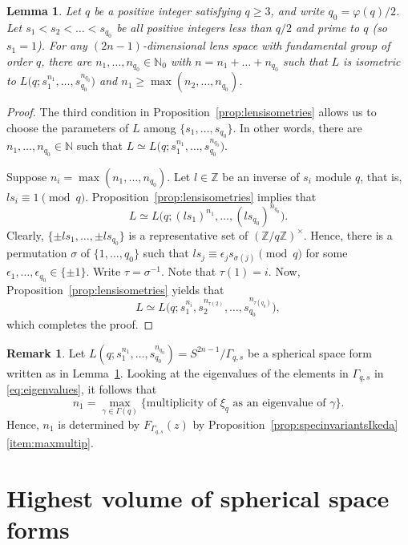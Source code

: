 \documentclass[12pt,a4paper,final]{amsart}
\theoremstyle{plain}
\newtheorem{lemma}[theorem]{Lemma}
\theoremstyle{definition}
\newtheorem{remark}[theorem]{Remark}
\theoremstyle{remark}
\numberwithin{equation}{section}
\newcommand{\N}{\mathbb N}
\newcommand{\Z}{\mathbb Z}
\begin{document}
\begin{lemma}\label{lem:exponentemaximo}
Let $q$ be a positive integer satisfying $q\geq3$, and write $q_0=\varphi(q)/2$.   
Let $s_1<s_2<\dots<s_{q_0}$ be all positive integers less than $q/2$ and prime to $q$ (so $s_1=1$). 
For any $(2n-1)$-dimensional lens space with fundamental group of order $q$, there are $n_1,\dots,n_{q_0}\in\N_0$  with $n=n_1+\dots+n_{q_0}$ such that 
$L$ is isometric to $L\big(q;s_1^{n_1},\dots,s_{q_0}^{n_{q_0}}\big)$
and $n_1\geq \max(n_2,\dots,n_{q_0})$. 
\end{lemma}

\begin{proof}
The third condition in Proposition~\ref{prop:lensisometries} allows us to choose the parameters of $L$ among $\{s_1,\dots,s_{q_0}\}$. 
In other words, there are $n_1,\dots,n_{q_0}\in\N$ such that $L\simeq L\big(q;s_1^{n_1},\dots,s_{q_0}^{n_{q_0}}\big)$. 

Suppose $n_i=\max(n_1,\dots,n_{q_0})$. 
Let $l\in\Z$ be an inverse of $s_i$ module $q$, that is, $ls_i\equiv 1\pmod q$. 
Proposition~\ref{prop:lensisometries} implies that
$$
L
\simeq L\big(q;(ls_1)^{n_1},\dots,(ls_{q_0})^{n_{q_0}}\big). 
$$
Clearly, $\{\pm ls_1,\dots,\pm ls_{q_0}\}$ is a representative set of $(\Z/q\Z)^\times$.
Hence, there is a permutation $\sigma$ of $\{1,\dots,q_0\}$ such that $ls_j\equiv \epsilon_j s_{\sigma(j)}\pmod q$ for some $\epsilon_1,\dots,\epsilon_{q_0} \in\{\pm1\}$. 
Write $\tau=\sigma^{-1}$.
Note that $\tau(1)=i$. 
Now, Proposition~\ref{prop:lensisometries} yields that
$$
L
\simeq L\big(q;s_1^{n_i},s_2^{n_{\tau(2)}}, \dots,s_{q_0}^{n_{\tau(q_0)}}\big),
$$
which completes the proof. 
\end{proof}

\begin{remark}\label{rem:highestmultiplicity}
Let $L(q;s_1^{n_1},\dots,s_{q_0}^{n_{q_0}})=S^{2n-1}/\Gamma_{q,s}$ be a spherical space form written as in Lemma~\ref{lem:exponentemaximo}. 
Looking at the eigenvalues of the elements in $\Gamma_{q,s}$ in \eqref{eq:eigenvalues}, it follows that 
$$
n_1=\max_{\gamma\in\Gamma(q)} \{ \text{multiplicity of $\xi_{q}$ as an eigenvalue of $\gamma$} \}. 
$$ 
Hence, $n_1$ is determined by $F_{\Gamma_{q,s}}(z)$ by Proposition~\ref{prop:specinvariantsIkeda}\eqref{item:maxmultip}. 
\end{remark}








\section{Highest volume of spherical space forms}\label{sec:manifolds}
\end{document}
